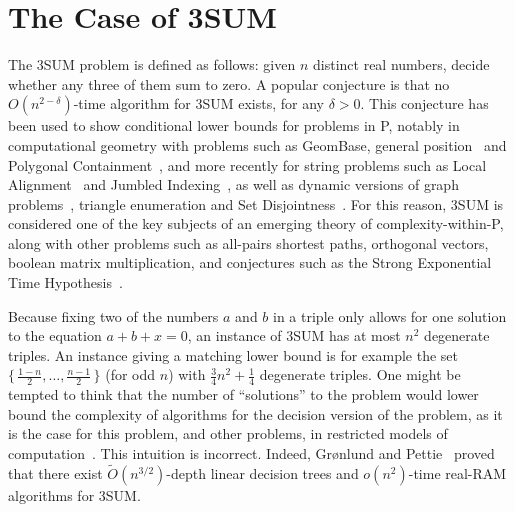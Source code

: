 \section{The Case of 3SUM}

The 3SUM problem is defined as follows: given $n$ distinct real numbers, decide
whether any three of them sum to zero.
%
A popular conjecture is that no $O(n^{2-\delta})$-time algorithm for 3SUM
exists, for any $\delta > 0$. This conjecture has been used to show conditional
lower bounds for problems in P, notably in computational geometry with problems
such as
GeomBase, general position~\cite{GO95}
and
Polygonal Containment~\cite{BH01},
and more recently for string problems such as
Local Alignment~\cite{AVW14}
and
Jumbled Indexing~\cite{ACLL14},
as well as
dynamic versions of graph problems~\cite{P10,AV14},
triangle enumeration and Set Disjointness~\cite{KPP16}.
%
For this reason, 3SUM is considered one of the key subjects of an
emerging theory of complexity-within-P, along with other problems such as
all-pairs shortest paths,
orthogonal vectors,
boolean matrix multiplication,
and conjectures such as
the Strong Exponential Time Hypothesis~\cite{AVY15,HKNS15,CGIMPS16}.

Because fixing two of the numbers $a$ and $b$ in a triple only allows for one
solution to the equation $a + b + x = 0$, an instance of 3SUM has at most
$n^2$ degenerate triples. An instance giving a matching lower bound is for
example the set $\{\,\frac{1-n}{2},\ldots,\frac{n-1}{2}\,\}$ (for odd $n$)
with $\frac{3}{4} n^2 + \frac 14$ degenerate triples.
%
One might be tempted to think that the number of ``solutions'' to the problem
would lower bound the complexity of algorithms for the decision version of the
problem, as it is the case for this problem, and other problems, in restricted
models of computation~\cite{Er96,Er99}.
%
This intuition is incorrect.
%
Indeed, Gr\o nlund and Pettie~\cite{GP14} proved that there exist
$\tilde{O}(n^{3/2})$-depth linear decision trees and $o(n^2)$-time real-RAM
algorithms for 3SUM\@.
